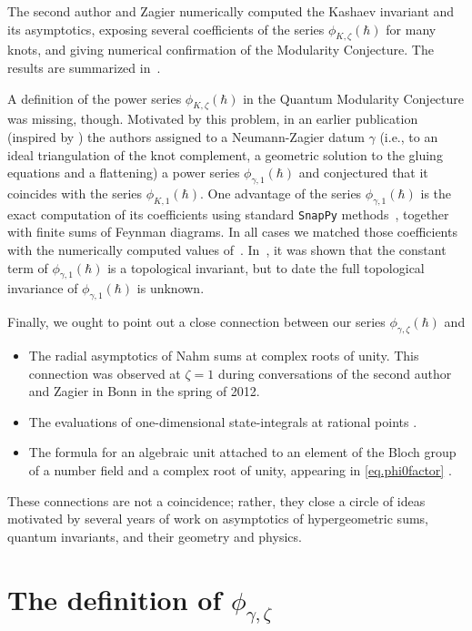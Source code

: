 \documentclass[12pt]{amsart}
\theoremstyle{definition}
\begin{document}
The second author and Zagier numerically computed the
Kashaev invariant and its asymptotics, exposing several coefficients of 
the series $\phi_{K,\zeta}(\hbar)$ for many knots, and giving numerical 
confirmation of the Modularity Conjecture. The results are summarized 
in~\cite{GZ1}.

A definition of the power series $\phi_{K,\zeta}(\hbar)$ in the Quantum 
Modularity Conjecture was missing, though. Motivated by this problem, 
in an earlier publication
~\cite{DG} (inspired by \cite{DGLZ}) the authors assigned to a 
Neumann-Zagier datum $\gamma$
(i.e., to an ideal triangulation of the knot complement, a geometric 
solution to the gluing equations and a flattening) a power series 
$\phi_{\gamma,1}(\hbar)$
and conjectured that it coincides with the series $\phi_{K,1}(\hbar)$. 
One advantage of the series $\phi_{\gamma,1}(\hbar)$ 
is the exact computation of its coefficients using standard {\tt SnapPy}
methods~\cite{snappy}, together with 
 finite sums of Feynman diagrams. 
In all cases we matched those coefficients 
with the numerically computed values of~\cite{GZ1}. In~\cite{DG}, it 
was shown that the constant term of 
$\phi_{\gamma,1}(\hbar)$ is a topological invariant, but to date the 
full topological invariance of $\phi_{\gamma,1}(\hbar)$ is unknown.

Finally, we ought to point out a close connection between our series
$\phi_{\gamma,\zeta}(\hbar)$ and 
\begin{itemize}
\item
The radial asymptotics of Nahm sums at
complex roots of unity. This connection was observed at $\zeta=1$ during
conversations of the second author and Zagier in Bonn in the spring of 2012.
\item
The evaluations of one-dimensional state-integrals at rational
points \cite{GK1,GK2}. 
\item
The formula for an algebraic unit attached to an element of the Bloch 
group of a number field and a complex root of unity, 
appearing in \eqref{eq.phi0factor} \cite{calegari}.
\end{itemize}
These connections are not a coincidence; rather, they close a circle of ideas
motivated by several years of work on asymptotics of 
hypergeometric sums, quantum invariants, and their geometry and physics.


\section{The definition of $\phi_{\gamma,\zeta}$}
\label{sec.def}
\end{document}
